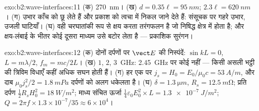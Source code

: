 \begin{solution}{exo:b2:wave-interfaces:11}
(क) \qty{270}{nm}। (ख) $d = 0.35\ell = \qty{95}{nm}$; $2.3\ell = \qty{620}{nm}$। (ग)
उभार काँच को छू लेते हैं और प्रकाश को त्वचा में निकल जाने देते हैं: संसूचक पर
गहरे उभार, उजली घाटियाँ। (घ)  वही
चरघातांकी रूप से क्षय करता तरंगफलन है जो निषिद्ध क्षेत्र में होता है; और क्षय-लंबाई
के भीतर कोई दूसरा माध्यम उसे बटोर लेता है --- प्रकाशिक सुरंगन।
\end{solution}

\begin{solution}{exo:b2:wave-interfaces:12}
(क) दोनों दर्पणों पर $\vect E$ की निस्पंदें: $\sin kL = 0$, $L = m\lambda/2$, $f_m = mc/2L$।
(ख) $1$, $2$, \qty{3}{GHz}: \qty{2.45}{GHz} पर कोई नहीं --- किसी असली भट्ठी की
त्रिविम विधाएँ कहीं अधिक सघन होती हैं। (ग) हर एक पर $j_s = H_0 = E_0/\mu_0c = \qty{53}{A/m}$,
और दाब $\mu_0j_s^2/2 = \qty{1.8}{mPa}$ दर्पणों को
अलग धकेलता है। (घ) $\delta = \qty{1.3}{\micro m}$, $R_s = \qty{12.5}{m\ohm}$; प्रति दर्पण $\tfrac12R_sH_0^2 =
\qty{18}{W/m^2}$; माध्य संचित ऊर्जा $\tfrac14\varepsilon_0E_0^2 \times L = \qty{1.3e-7}{J/m^2}$;
$Q = 2\pi f \times 1.3 \times 10^{-7}/35 \approx 6 \times 10^4$।
\end{solution}

